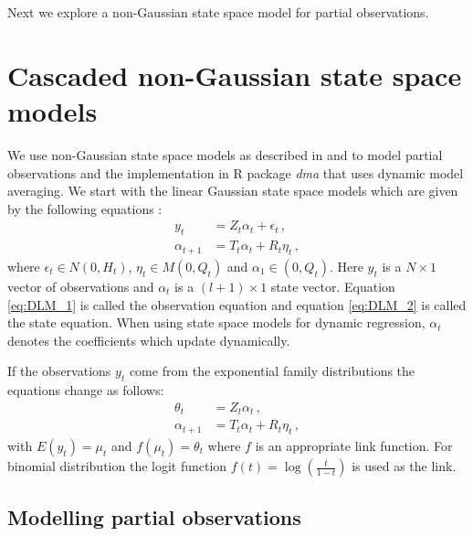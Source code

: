 \documentclass[a4paper,11pt]{article}
\begin{document}
Next we explore a non-Gaussian state space model for partial observations.

\section{Cascaded non-Gaussian state space models} \label{sec:CascadedDLM}

We use non-Gaussian state space models as described in \cite{durbin1998time} and \cite{mccormick2012dynamic} to model partial observations and the implementation in R package \textit{dma} \cite{dma} that uses dynamic model averaging. We start with the linear Gaussian state space models which are given by the following equations :
\begin{align}
	y_t          & = Z_t \alpha_t + \epsilon_t \, , \label{eq:DLM_1} \\
	\alpha_{t+1} & = T_t \alpha_t + R_t \eta_t \, , \label{eq:DLM_2}
\end{align}
where $\epsilon_t \in N \left(0, H_t\right)$, $\eta_t \in M \left(0, Q_t\right)$ and $\alpha_1 \in \left(0, Q_t\right)$. Here $y_t$ is a $N \times 1 $ vector of observations and $\alpha_t$ is a $(l+1) \times 1$ state vector. Equation \eqref{eq:DLM_1} is called the observation equation and equation \eqref{eq:DLM_2} is called the state equation. When using state space models for dynamic regression, $\alpha_t$ denotes the coefficients which update dynamically.

If the observations $y_t$ come from the exponential family distributions the equations change as follows:
\begin{align}
	\theta_t     & = Z_t \alpha_t \, , \label{eq:GDLM_2}              \\
	\alpha_{t+1} & = T_t \alpha_t + R_t \eta_t \, , \label{eq:GDLM_3}
\end{align}
with $E \left( y_t \right ) = \mu_t $ and $f\left( \mu_t \right ) = \theta_t $ where $f$ is an appropriate link function. For binomial distribution the logit function $f(t)=\log\left( \frac{t}{1-t}\right)$ is used as the link.

\subsection{Modelling partial observations}
\end{document}
